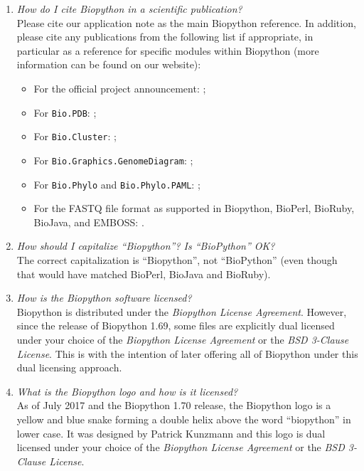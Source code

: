 \begin{enumerate}

  \item \emph{How do I cite Biopython in a scientific publication?} \\
  Please cite our application note \cite[Cock \textit{et al.}, 2009]{cock2009}
  as the main Biopython reference.
  In addition, please cite any publications from the following list if appropriate, in particular as a reference for specific modules within Biopython (more information can be found on our website):
  \begin{itemize}
    \item For the official project announcement: \cite[Chapman and Chang, 2000]{chapman2000};
    \item For \verb+Bio.PDB+: \cite[Hamelryck and Manderick, 2003]{hamelryck2003a};
    \item For \verb+Bio.Cluster+: \cite[De Hoon \textit{et al.}, 2004]{dehoon2004};
    \item For \verb+Bio.Graphics.GenomeDiagram+: \cite[Pritchard \textit{et al.}, 2006]{pritchard2006};
    \item For \verb+Bio.Phylo+ and \verb+Bio.Phylo.PAML+: \cite[Talevich \textit{et al.}, 2012]{talevich2012};
    \item For the FASTQ file format as supported in Biopython, BioPerl, BioRuby, BioJava, and EMBOSS: \cite[Cock \textit{et al.}, 2010]{cock2010}.
  \end{itemize}

  \item \emph{How should I capitalize ``Biopython''?  Is ``BioPython'' OK?} \\
  The correct capitalization is ``Biopython'', not ``BioPython'' (even though
  that would have matched BioPerl, BioJava and BioRuby).

  \item \emph{How is the Biopython software licensed?} \\
  Biopython is distributed under the \emph{Biopython License Agreement}.
  However, since the release of Biopython 1.69, some files are explicitly
  dual licensed under your choice of the \emph{Biopython License Agreement}
  or the \emph{BSD 3-Clause License}. This is with the intention of later
  offering all of Biopython under this dual licensing approach.

  \item \emph{What is the Biopython logo and how is it licensed?} \\
  As of July 2017 and the Biopython 1.70 release, the Biopython logo is a
  yellow and blue snake forming a double helix above the word ``biopython''
  in lower case. It was designed by Patrick Kunzmann and this logo is dual
  licensed under your choice of the \emph{Biopython License Agreement} or
  the \emph{BSD 3-Clause License}.


\end{enumerate}
